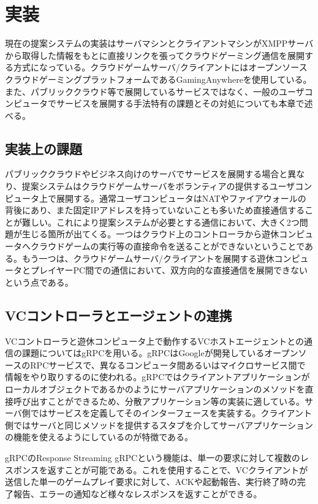\section{実装}

現在の提案システムの実装はサーバマシンとクライアントマシンがXMPPサーバから取得した情報をもとに直接リンクを張ってクラウドゲーミング通信を展開する方式になっている。クラウドゲームサーバ/クライアントにはオープンソースクラウドゲーミングプラットフォームであるGamingAnywhereを使用している。また、パブリッククラウド等で展開しているサービスではなく、一般のユーザコンピュータでサービスを展開する手法特有の課題とその対処についても本章で述べる。

\subsection{実装上の課題}
パブリッククラウドやビジネス向けのサーバでサービスを展開する場合と異なり、提案システムはクラウドゲームサーバをボランティアの提供するユーザコンピュータ上で展開する。通常ユーザコンピュータはNATやファイアウォールの背後にあり、また固定IPアドレスを持っていないことも多いため直接通信することが難しい。これにより提案システムが必要とする通信において、大きく2つ問題が生じる箇所が出てくる。一つはクラウド上のコントローラから遊休コンピュータへクラウドゲームの実行等の直接命令を送ることができないということである。もう一つは、クラウドゲームサーバ/クライアントを展開する遊休コンピュータとプレイヤーPC間での通信において、双方向的な直接通信を展開できないという点である。

\subsection{VCコントローラとエージェントの連携}
VCコントローラと遊休コンピュータ上で動作するVCホストエージェントとの通信の課題についてはgRPC\cite{grpc}を用いる。gRPCはGoogleが開発しているオープンソースのRPCサービスで、異なるコンピュータ間あるいはマイクロサービス間で情報をやり取りするのに使われる。gRPCではクライアントアプリケーションがローカルオブジェクトであるかのようにサーバアプリケーションのメソッドを直接呼び出すことができるため、分散アプリケーション等の実装に適している。サーバ側ではサービスを定義してそのインターフェースを実装する。クライアント側ではサーバと同じメソッドを提供するスタブを介してサーバアプリケーションの機能を使えるようにしているのが特徴である。

gRPCのResponse Streaming gRPCという機能は、単一の要求に対して複数のレスポンスを返すことが可能である。これを使用することで、VCクライアントが送信した単一のゲームプレイ要求に対して、ACKや起動報告、実行終了時の完了報告、エラーの通知など様々なレスポンスを返すことができる。

